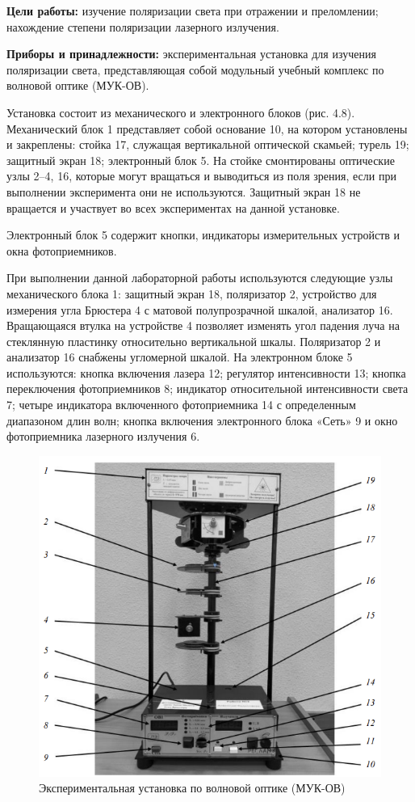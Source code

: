 \textbf{Цели работы:} изучение поляризации света при отражении и преломлении; нахождение степени поляризации лазерного излучения.

\textbf{Приборы и принадлежности:} экспериментальная установка для изучения поляризации света, представляющая собой модульный учебный комплекс по волновой оптике (МУК-ОВ).

Установка состоит из механического и электронного блоков (рис. 4.8). Механический блок 1 представляет собой основание 10, на котором установлены и закреплены: стойка 17, служащая вертикальной оптической скамьей; турель 19; защитный экран 18; электронный блок 5. На стойке смонтированы оптические узлы 2--4, 16, которые могут вращаться и выводиться из поля зрения, если при выполнении эксперимента они не используются. Защитный экран 18 не вращается и участвует во всех экспериментах на данной установке.

Электронный блок 5 содержит кнопки, индикаторы измерительных устройств и окна фотоприемников.

При выполнении данной лабораторной работы используются следующие узлы механического блока 1: защитный экран 18, поляризатор 2, устройство для измерения угла Брюстера 4 с матовой полупрозрачной шкалой, анализатор 16. Вращающаяся втулка на устройстве 4 позволяет изменять угол падения луча на стеклянную пластинку относительно вертикальной шкалы. Поляризатор 2 и анализатор 16 снабжены угломерной шкалой. На электронном блоке 5 используются: кнопка включения лазера 12; регулятор интенсивности 13; кнопка переключения фотоприемников 8; индикатор относительной интенсивности света 7; четыре индикатора включенного фотоприемника 14 с определенным диапазоном длин волн; кнопка включения электронного блока «Сеть» 9 и окно фотоприемника лазерного излучения 6.

\begin{figure}[H]
    \def\thefigure{4.8}
    \protect{} 
	
    \centering
	\captionsetup{justification=centering}
    \includegraphics[width=0.8\linewidth]{figs/1.png}
	\caption{Экспериментальная установка по волновой оптике (МУК-ОВ)}
	\label{fig:exp_setup}
\end{figure}

